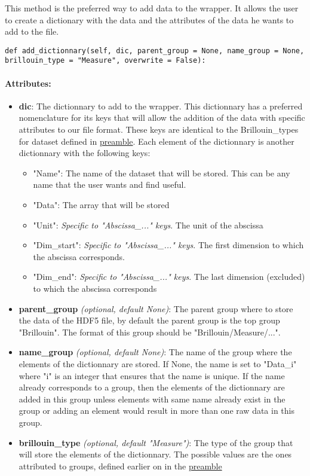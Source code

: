This method is the preferred way to add data to the wrapper. It allows the user to create a dictionary with the data and the attributes of the data he wants to add to the file. 

\begin{lstlisting}
def add_dictionnary(self, dic, parent_group = None, name_group = None, brillouin_type = "Measure", overwrite = False):
\end{lstlisting}

\paragraph{Attributes:}

\begin{itemize}
    \item \textbf{dic}: The dictionnary to add to the wrapper. This dictionnary has a preferred nomenclature for its keys that will allow the addition of the data with specific attributes to our file format. These keys are identical to the Brillouin\_types for dataset defined in \hyperref[subsec:preamble.file_structure.complete_structure]{preamble}. Each element of the dictionnary is another dictionnary with the following keys:
    \begin{itemize}
        \item "Name": The name of the dataset that will be stored. This can be any name that the user wants and find useful.
        \item "Data": The array that will be stored
        \item "Unit": \textit{Specific to "Abscissa\_..." keys}. The unit of the abscissa
        \item "Dim\_start": \textit{Specific to "Abscissa\_..." keys}. The first dimension to which the abscissa corresponds.
        \item "Dim\_end": \textit{Specific to "Abscissa\_..." keys}. The last dimension (excluded) to which the abscissa corresponds
    \end{itemize}
    \item \textbf{parent\_group} \textit{(optional, default None)}: The parent group where to store the data of the HDF5 file, by default the parent group is the top group "Brillouin". The format of this group should be "Brillouin/Measure/...". 
    \item \textbf{name\_group} \textit{(optional, default None)}: The name of the group where the elements of the dictionnary are stored. If None, the name is set to "Data\_i" where "i" is an integer that ensures that the name is unique. If the name already corresponds to a group, then the elements of the dictionnary are added in this group unless elements with same name already exist in the group or adding an element would result in more than one raw data in this group. 
    \item \textbf{brillouin\_type} \textit{(optional, default "Measure")}: The type of the group that will store the elements of the dictionnary. The possible values are the ones attributed to groups, defined earlier on in the \hyperref[subsec:preamble.file_structure.complete_structure]{preamble}
\end{itemize}

